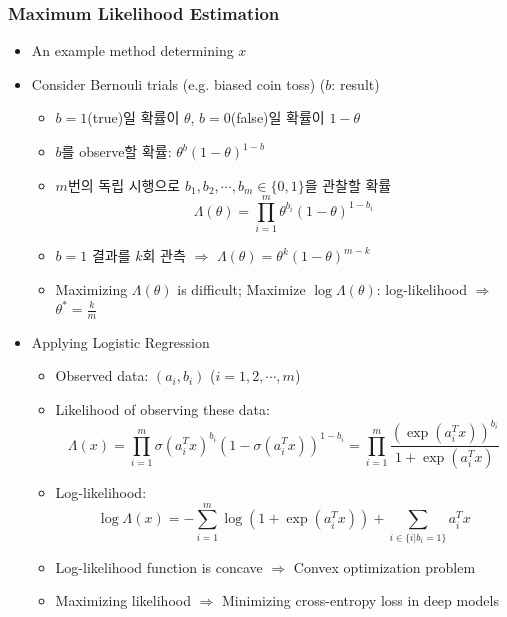 \subsubsection*{Maximum Likelihood Estimation}
\begin{itemize}
    \item An example method determining $x$
    \item Consider Bernouli trials (e.g. biased coin toss) ($b$: result)
    \begin{itemize}
        \item $b=1$(true)일 확률이 $\theta$, $b=0$(false)일 확률이 $1-\theta$
        \item $b$를 observe할 확률: $\theta^b(1-\theta)^{1-b}$
        \item $m$번의 독립 시행으로 $b_1,b_2,\cdots,b_m\in\{0,1\}$을 관찰할 확률
        \begin{equation}
            \Lambda(\theta)=\prod_{i=1}^m\theta^{b_i}(1-\theta)^{1-b_i}
        \end{equation}
        \item $b=1$ 결과를 $k$회 관측 $\Rightarrow$ $\Lambda(\theta)=\theta^k(1-\theta)^{m-k}$
        \item Maximizing $\Lambda(\theta)$ is difficult; Maximize $\log\Lambda(\theta)$: log-likelihood $\Rightarrow$ $\theta^\ast=\frac{k}{m}$
    \end{itemize}
    \item Applying Logistic Regression
    \begin{itemize}
        \item Observed data: $(a_i,b_i)$ ($i=1,2,\cdots,m$)
        \item Likelihood of observing these data:
        \begin{equation}
            \Lambda(x)=\prod_{i=1}^m\sigma(a_i^Tx)^{b_i}\left(1-\sigma(a_i^Tx)\right)^{1-b_i}=\prod_{i=1}^m\frac{\left(\exp(a_i^Tx)\right)^{b_i}}{1+\exp(a_i^Tx)}
        \end{equation}
        \item Log-likelihood:
        \begin{equation}
            \log\Lambda(x)=-\sum_{i=1}^m\log\left(1+\exp(a_i^Tx)\right)+\sum_{i\in\{i|b_i=1\}}a_i^Tx
        \end{equation}
        \item Log-likelihood function is concave $\Rightarrow$ Convex optimization problem
        \item Maximizing likelihood $\Rightarrow$ Minimizing cross-entropy loss in deep models
    \end{itemize}
\end{itemize}

